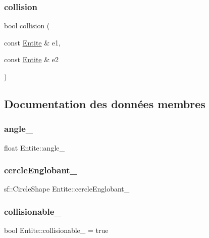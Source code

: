 \subsubsection{\texorpdfstring{collision}{collision}}
{\footnotesize\ttfamily bool collision (\begin{DoxyParamCaption}\item[{const \hyperlink{class_entite}{Entite} \&}]{e1,  }\item[{const \hyperlink{class_entite}{Entite} \&}]{e2 }\end{DoxyParamCaption})\hspace{0.3cm}{\ttfamily [friend]}}



\subsection{Documentation des données membres}
\mbox{\label{class_entite_a2d6dc6bfcee492337b7422f12b393141}} 
\subsubsection{\texorpdfstring{angle\+\_\+}{angle\_}}
{\footnotesize\ttfamily float Entite\+::angle\+\_\+\hspace{0.3cm}{\ttfamily [protected]}}

\mbox{\label{class_entite_a5b6c62e4dc54221a84ce4dc824fdb2da}} 
\subsubsection{\texorpdfstring{cercle\+Englobant\+\_\+}{cercleEnglobant\_}}
{\footnotesize\ttfamily sf\+::\+Circle\+Shape Entite\+::cercle\+Englobant\+\_\+\hspace{0.3cm}{\ttfamily [protected]}}

\mbox{\label{class_entite_a37bb9bd568e9e1c904eaa83ec49a2b16}} 
\subsubsection{\texorpdfstring{collisionable\+\_\+}{collisionable\_}}
{\footnotesize\ttfamily bool Entite\+::collisionable\+\_\+ = true\hspace{0.3cm}{\ttfamily [protected]}}

